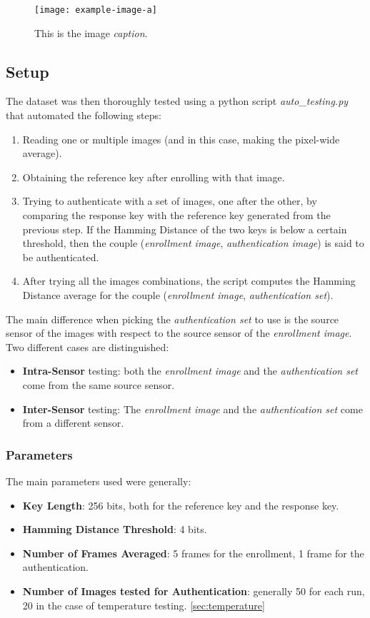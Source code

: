 \begin{figure}[h!]
	\vspace{0.5cm}
	\texttt{[image: example-image-a]}
	\caption{This is the image \emph{caption}.}
	\label{fig:dataset2}
\end{figure} 

\subsection{Setup}
The dataset was then thoroughly tested using a python script \emph{auto\_testing.py} that automated the following steps:

\begin{enumerate}
	\item Reading one or multiple images (and in this case, making the pixel-wide average).
	\item Obtaining the reference key after enrolling with that image.
	\item Trying to authenticate with a set of images, one after the other, by comparing the response key with the reference key generated from the previous step. If the Hamming Distance of the two keys is below a certain threshold, then the couple (\emph{enrollment image}, \emph{authentication image}) is said to be authenticated.
	\item After trying all the images combinations, the script computes the Hamming Distance average for the couple (\emph{enrollment image}, \emph{authentication set}).
\end{enumerate}

The main difference when picking the \emph{authentication set} to use is the source sensor of the images with respect to the source sensor of the \emph{enrollment image}. Two different cases are distinguished:

\begin{itemize}
	\item \textbf{Intra-Sensor} testing: both the \emph{enrollment image} and the \emph{authentication set} come from the same source sensor.
	\item \textbf{Inter-Sensor} testing: The \emph{enrollment image} and the \emph{authentication set} come from a different sensor.
\end{itemize}

\subsubsection{Parameters}
The main parameters used were generally:
\begin{itemize}
	\item \textbf{Key Length}: 256 bits, both for the reference key and the response key.
	\item \textbf{Hamming Distance Threshold}: 4 bits.
	\item \textbf{Number of Frames Averaged}: 5 frames for the enrollment, 1 frame for the authentication.
	\item \textbf{Number of Images tested for Authentication}: generally 50 for each run, 20 in the case of temperature testing. \ref{sec:temperature}
\end{itemize}

